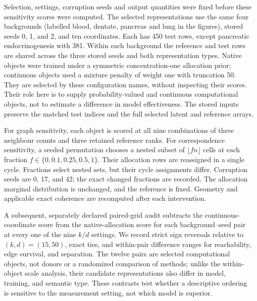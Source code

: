 \documentclass[11pt]{article}
\begin{document}
Selection, settings, corruption seeds and output quantities were fixed before these sensitivity scores were computed. The selected representations use the same four backgrounds (labelled blood, dentate, pancreas and lung in the figures), stored seeds 0, 1, and 2, and ten coordinates. Each has 450 test rows, except pancreatic endocrinogenesis with 381. Within each background the reference and test rows are shared across the three stored seeds and both representation types. Native objects were trained under a symmetric concentration-one allocation prior; continuous objects used a mixture penalty of weight one with truncation 50. They are selected by these configuration names, without inspecting their scores. Their role here is to supply probability-valued and continuous computational objects, not to estimate a difference in model effectiveness. The stored inputs preserve the matched test indices and the full selected latent and reference arrays.

For graph sensitivity, each object is scored at all nine combinations of three neighbour counts and three retained reference ranks. For correspondence sensitivity, a seeded permutation chooses a nested subset of $\lfloor fn\rfloor$ cells at each fraction $f\in\{0,0.1,0.25,0.5,1\}$. Their allocation rows are reassigned in a single cycle. Fractions select nested sets, but their cycle assignments differ. Corruption seeds are 0, 17, and 42; the exact changed fractions are recorded. The allocation marginal distribution is unchanged, and the reference is fixed. Geometry and applicable exact coherence are recomputed after each intervention.

A subsequent, separately declared paired-grid audit subtracts the continuous-coordinate score from the native-allocation score for each background--seed pair at every one of the nine $k/d$ settings. We record strict sign reversals relative to $(k,d)=(15,50)$, exact ties, and within-pair difference ranges for reachability, edge survival, and separation. The twelve pairs are selected computational objects, not donors or a randomized comparison of methods; unlike the within-object scale analysis, their candidate representations also differ in model, training, and semantic type. These contrasts test whether a descriptive ordering is sensitive to the measurement setting, not which model is superior.
\end{document}
